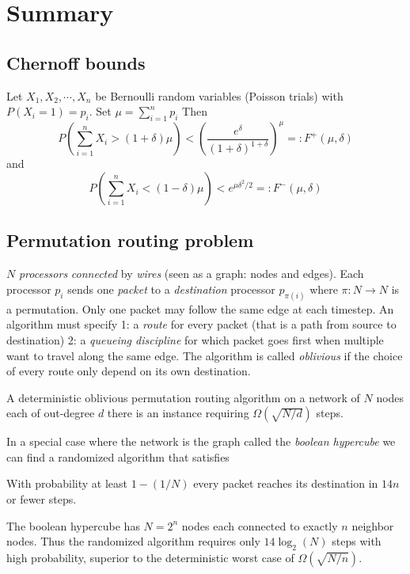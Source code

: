 \section*{Summary}

\subsection*{Chernoff bounds}
Let
$X_1, X_2, \cdots, X_n$
be Bernoulli random variables (Poisson trials) with
$P(X_i = 1) = p_i$.
Set $\mu = \sum_{i=1}^n p_i$
Then
\[ P\left(\sum_{i=1}^n X_i > (1+\delta)\mu \right) < \left( \frac{e^\delta}{(1+\delta)^{1+\delta}} \right)^\mu =: F^+(\mu, \delta) \]
and
\[ P \left( \sum_{i=1}^n X_i < (1-\delta)\mu \right) < e^{\mu \delta^2 /2} =: F^-(\mu, \delta) \]

\subsection*{Permutation routing problem}
$N$ \emph{processors} \emph{connected} by \emph{wires} (seen as a graph: nodes and edges).
Each processor $p_i$ sends one \emph{packet} to a \emph{destination} processor $p_{\pi(i)}$ where $\pi : N \to N$ is a permutation.
Only one packet may follow the same edge at each timestep.
An algorithm must specify
1: a \emph{route} for every packet (that is a path from source to destination)
2: a \emph{queueing discipline} for which packet goes first when multiple want to travel along the same edge.
The algorithm is called \emph{oblivious} if the choice of every route only depend on its own destination.
\begin{theorem}
  A deterministic oblivious permutation routing algorithm on a network of $N$ nodes each of out-degree $d$ there is an instance requiring $\Omega(\sqrt{N/d})$ steps.
\end{theorem}
In a special case where the network is the graph called the \emph{boolean hypercube} we can find a randomized algorithm that satisfies
\begin{theorem}
  With probability at least $1 - (1/N)$ every packet reaches its destination in $14n$ or fewer steps.
\end{theorem}
The boolean hypercube has $N = 2^n$ nodes each connected to exactly $n$ neighbor nodes.
Thus the randomized algorithm requires only $14 \log_2(N)$ steps with high probability, superior to the deterministic worst case of $\Omega(\sqrt{N/n})$.
